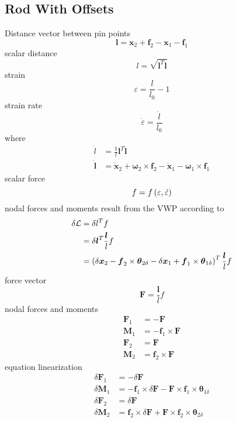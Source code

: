 \documentclass[10pt,dvips,fleqn,subeqn]{report}
\newcommand{\T}[1]{\boldsymbol{#1}}
\begin{document}
\subsection{Rod With Offsets}
Distance vector between pin points
\begin{equation}
	\T{l} = \T{x}_2 + \T{f}_2 - \T{x}_1 - \T{f}_1
\end{equation}
scalar distance
\begin{equation}
	l = \sqrt{\T{l}^T \T{l}}
\end{equation}
strain
\begin{equation}
	\varepsilon = \frac{l}{l_0} - 1
\end{equation}
strain rate
\begin{equation}
	\dot{\varepsilon} = \frac{\dot{l}}{l_0}
\end{equation}
where
\begin{align}
	\dot{l} &= \frac{1}{l} \T{l}^T \dot{\T{l}} \\
	\dot{\T{l}} &= \dot{\T{x}}_2 + \T{\omega}_2 \times \T{f}_2
		- \dot{\T{x}}_1 - \T{\omega}_1 \times \T{f}_1
\end{align}
scalar force
\begin{equation}
	f = f\left( \varepsilon, \dot{\varepsilon} \right)
\end{equation}
nodal forces and moments result from the VWP according to
\begin{align}
	\delta \mathcal{L} &= \delta l^T f \\
	&= \delta\T{l}^T \frac{\T{l}}{l} f \\
	&= \plbr{
		\delta\T{x}_2
		- \T{f}_2 \times \T{\theta}_{2\delta}
		- \delta\T{x}_1
		+ \T{f}_1 \times \T{\theta}_{1\delta}
	}^T \frac{\T{l}}{l} f
\end{align}
force vector
\begin{equation}
	\T{F} = \frac{\T{l}}{l} f
\end{equation}
nodal forces and moments
\begin{align}
	\T{F}_1 &= -\T{F} \\
	\T{M}_1 &= -\T{f}_1 \times \T{F} \\
	\T{F}_2 &= \T{F} \\
	\T{M}_2 &= \T{f}_2 \times \T{F}
\end{align}
equation linearization
\begin{align}
	\delta\T{F}_1 &= -\delta\T{F} \\
	\delta\T{M}_1 &= -\T{f}_1 \times \delta\T{F} - \T{F}\times\T{f}_1\times \T{\theta}_{1\delta} \\
	\delta\T{F}_2 &= \delta\T{F} \\
	\delta\T{M}_2 &= \T{f}_2 \times \delta\T{F} + \T{F}\times\T{f}_2\times \T{\theta}_{2\delta}
\end{align}
\end{document}
